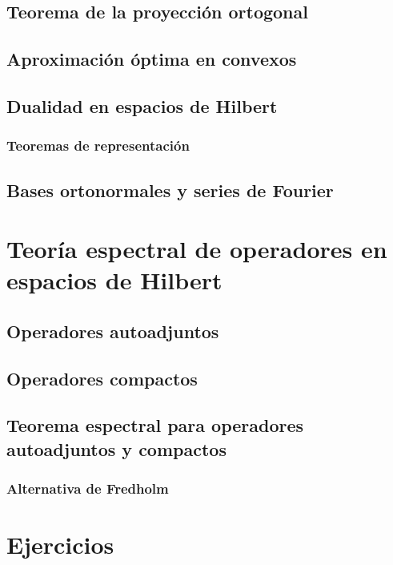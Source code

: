 \documentclass[bibnumbers, palatino]{apuntes}
\begin{document}
\section{Teorema de la proyección ortogonal}

\section{Aproximación óptima en convexos}

\section{Dualidad en espacios de Hilbert}

\subsection{Teoremas de representación}

\section{Bases ortonormales y series de Fourier}

\chapter{Teoría espectral de operadores en espacios de Hilbert}

\section{Operadores autoadjuntos}

\section{Operadores compactos}

\section{Teorema espectral para operadores autoadjuntos y compactos}

\subsection{Alternativa de Fredholm}

\appendix

\chapter{Ejercicios}


\nocite{brezis2010functional,reed1980methods,rudin1991functional,ApuntesVarReal}
{}

\printindex
\end{document}
